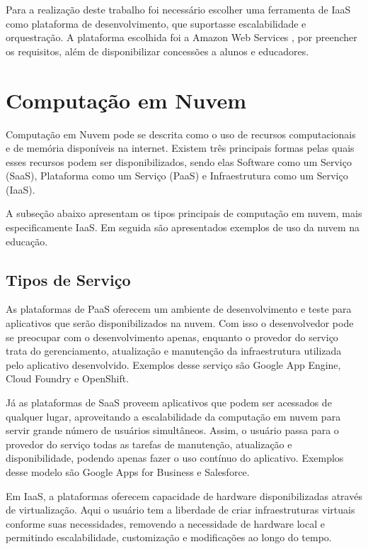 \documentclass[tg]{mdtufsm}
\begin{document}
Para a realização deste trabalho foi necessário escolher uma ferramenta de IaaS como plataforma de desenvolvimento, que suportasse escalabilidade e orquestração. A plataforma escolhida foi a Amazon Web Services \cite{aws}, por preencher os requisitos, além de disponibilizar concessões a alunos e educadores.

\section{Computação em Nuvem}


Computação em Nuvem pode se descrita como o uso de recursos computacionais e de memória disponíveis na internet. Existem três principais formas pelas quais esses recursos podem ser disponibilizados, sendo elas Software como um Serviço (SaaS), Plataforma como um Serviço (PaaS) e Infraestrutura como um Serviço (IaaS).

A subseção abaixo apresentam os tipos principais de computação em nuvem, mais especificamente IaaS. Em seguida são apresentados exemplos de uso da nuvem na educação.

\subsection{Tipos de Serviço}

As plataformas de PaaS oferecem um ambiente de desenvolvimento e teste para aplicativos que serão disponibilizados na nuvem. Com isso o desenvolvedor pode se preocupar com o desenvolvimento apenas, enquanto o provedor do serviço trata do gerenciamento, atualização e manutenção da infraestrutura utilizada pelo aplicativo desenvolvido. Exemplos desse serviço são Google App Engine, Cloud Foundry e OpenShift.

Já as plataformas de SaaS proveem aplicativos que podem ser acessados de qualquer lugar, aproveitando a escalabilidade da computação em nuvem para servir grande número de usuários simultâneos. Assim, o usuário passa para o provedor do serviço todas as tarefas de manutenção, atualização e disponibilidade, podendo apenas fazer o uso contínuo do aplicativo. Exemplos desse modelo são Google Apps for Business e Salesforce.

Em IaaS, a plataformas oferecem capacidade de hardware disponibilizadas através de virtualização. Aqui o usuário tem a liberdade de criar infraestruturas virtuais conforme suas necessidades, removendo a necessidade de hardware local e permitindo escalabilidade, customização e modificações ao longo do tempo.
\end{document}
